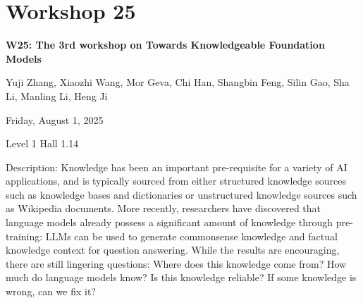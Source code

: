 \clearpage


\section[W25: The 3rd workshop on Towards Knowledgeable Foundation Models]{Workshop 25}
\label{workshop_25}

\begin{center}
    {\Large \textbf{W25: The 3rd workshop on Towards Knowledgeable Foundation Models}}

Yuji Zhang, Xiaozhi Wang, Mor Geva, Chi Han, Shangbin Feng, Silin Gao, Sha Li, Manling Li, Heng Ji

    Friday, August 1, 2025

 Level 1 Hall 1.14
    
\end{center}

Description: Knowledge has been an important pre-requisite for a variety of AI applications, and is typically sourced from either structured knowledge sources such as knowledge bases and dictionaries or unstructured knowledge sources such as Wikipedia documents. More recently, researchers have discovered that language models already possess a significant amount of knowledge through pre-training: LLMs can be used to generate commonsense knowledge and factual knowledge context for question answering. While the results are encouraging, there are still lingering questions: Where does this knowledge come from? How much do language models know? Is this knowledge reliable? If some knowledge is wrong, can we fix it?

